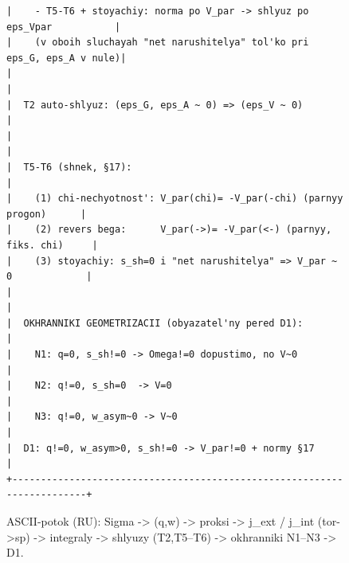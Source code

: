 \begin{figure}[p]
{\begin{minipage}{0.97\textwidth}
\begin{Verbatim}[fontsize=\footnotesize]
|    - T5-T6 + stoyachiy: norma po V_par -> shlyuz po eps_Vpar           |
|    (v oboih sluchayah "net narushitelya" tol'ko pri eps_G, eps_A v nule)|
|                                                                        |
|  T2 auto-shlyuz: (eps_G, eps_A ~ 0) => (eps_V ~ 0)                    |
|                                                                        |
|  T5-T6 (shnek, §17):                                                   |
|    (1) chi-nechyotnost': V_par(chi)= -V_par(-chi) (parnyy progon)      |
|    (2) revers bega:      V_par(->)= -V_par(<-) (parnyy, fiks. chi)     |
|    (3) stoyachiy: s_sh=0 i "net narushitelya" => V_par ~ 0             |
|                                                                        |
|  OKHRANNIKI GEOMETRIZACII (obyazatel'ny pered D1):                     |
|    N1: q=0, s_sh!=0 -> Omega!=0 dopustimo, no V~0                      |
|    N2: q!=0, s_sh=0  -> V=0                                            |
|    N3: q!=0, w_asym~0 -> V~0                                           |
|  D1: q!=0, w_asym>0, s_sh!=0 -> V_par!=0 + normy §17                  |
+------------------------------------------------------------------------+
\end{Verbatim}
\end{minipage}%
}

\caption{ASCII-potok (RU): Sigma -> (q,w) -> proksi -> j\_ext / j\_int (tor->sp) -> integraly -> shlyuzy (T2,T5--T6) -> okhranniki N1--N3 -> D1.}
\label{fig:C_flow_ascii_ru}
\end{figure}
